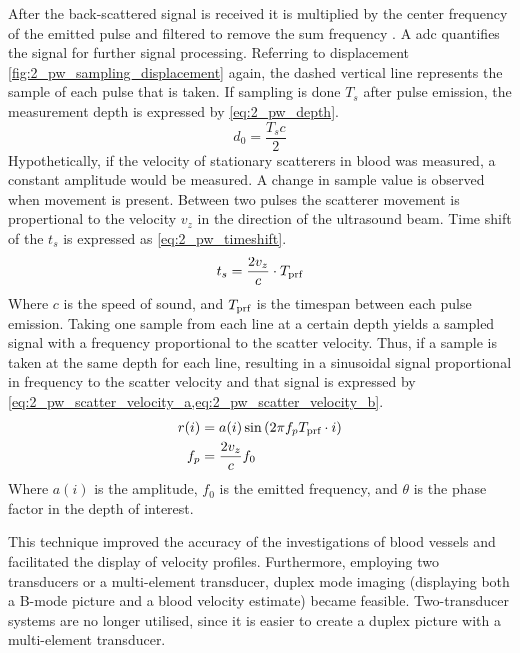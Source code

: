 After the back-scattered signal is received it is multiplied by the center frequency of the emitted pulse and filtered to remove the sum frequency \cite{JensenUltrasoundBook}. A \gls{adc} quantifies the signal for further signal processing. Referring to displacement \cref{fig:2_pw_sampling_displacement} again, the dashed vertical line represents the sample of each pulse that is taken. If sampling is done $T_{s}$ after pulse emission, the measurement depth is expressed by \cref{eq:2_pw_depth}.
\begin{equation} \label{eq:2_pw_depth}
	d_{0} = \frac{T_{s}c}{2}
\end{equation}
Hypothetically, if the velocity of stationary scatterers in blood was measured, a constant amplitude would be measured. A change in sample value is observed when movement is present. Between two pulses the scatterer movement is propertional to the velocity $v_{z}$ in the direction of the ultrasound beam. Time shift of the $t_{s}$ is expressed as \cref{eq:2_pw_timeshift}.
\begin{equation} \label{eq:2_pw_timeshift}
	t_{s} = \frac{2v_{z}}{c}\cdot T_{\textup{prf}}
\end{equation}
Where $c$ is the speed of sound, and $T_{\textup{prf}}$ is the timespan between each pulse emission. Taking one sample from each line at a certain depth yields a sampled signal with a frequency proportional to the scatter velocity. Thus, if a sample is taken at the same depth for each line, resulting in a sinusoidal signal proportional in frequency to the scatter velocity \cite{Munk_Thesis} and that signal is expressed by \cref{eq:2_pw_scatter_velocity_a,eq:2_pw_scatter_velocity_b}.
\begin{subequations}
	\begin{align} 
		r(i) &= a(i) \sin \left( 2\pi f_{p} T_{\textup{prf}} \cdot i \right) \label{eq:2_pw_scatter_velocity_a} \\
		f_{p} &= \frac{2 v_{z}}{c} f_{0} \label{eq:2_pw_scatter_velocity_b}
	\end{align}
\end{subequations}
Where $a(i)$ is the amplitude, $f_{0}$ is the emitted frequency, and $\theta$ is the phase factor in the depth of interest. 

This technique improved the accuracy of the investigations of blood vessels and facilitated the display of velocity profiles. Furthermore, employing two transducers or a multi-element transducer, duplex mode imaging (displaying both a B-mode picture and a blood velocity estimate) became feasible. Two-transducer systems are no longer utilised, since it is easier to create a duplex picture with a multi-element transducer. 